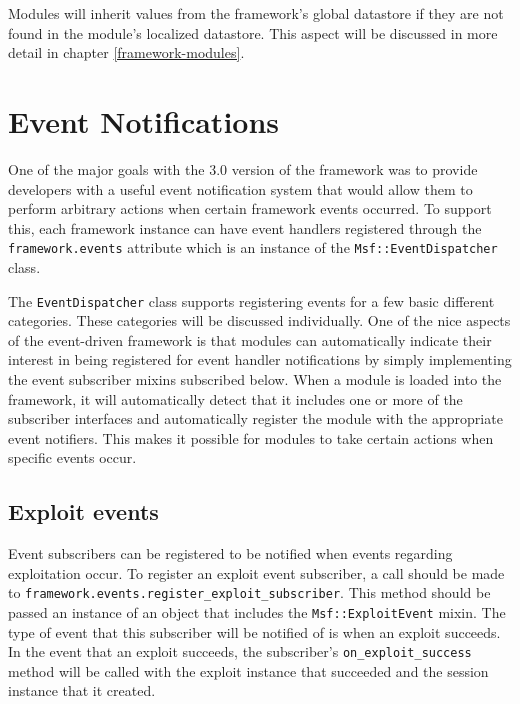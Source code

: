 \documentclass{report}
\begin{document}
\par
Modules will inherit values from the framework's global datastore if
they are not found in the module's localized datastore.  This aspect
will be discussed in more detail in chapter \ref{framework-modules}.

    \section{Event Notifications}

\par
One of the major goals with the 3.0 version of the framework was to
provide developers with a useful event notification system that
would allow them to perform arbitrary actions when certain framework
events occurred.  To support this, each framework instance can have
event handlers registered through the \texttt{framework.events}
attribute which is an instance of the \texttt{Msf::EventDispatcher}
class.

\par
The \texttt{EventDispatcher} class supports registering events for a
few basic different categories.  These categories will be discussed
individually.  One of the nice aspects of the event-driven framework
is that modules can automatically indicate their interest in being
registered for event handler notifications by simply implementing
the event subscriber mixins subscribed below.  When a module is
loaded into the framework, it will automatically detect that it
includes one or more of the subscriber interfaces and automatically
register the module with the appropriate event notifiers.  This
makes it possible for modules to take certain actions when specific
events occur.

        \subsection{Exploit events}

\par
Event subscribers can be registered to be notified when events
regarding exploitation occur.  To register an exploit event
subscriber, a call should be made to
\texttt{framework.events.register\_exploit\_subscriber}.  This
method should be passed an instance of an object that includes the
\texttt{Msf::ExploitEvent} mixin.  The type of event that this
subscriber will be notified of is when an exploit succeeds.  In the
event that an exploit succeeds, the subscriber's
\texttt{on\_exploit\_success} method will be called with the exploit
instance that succeeded and the session instance that it created.
\end{document}
